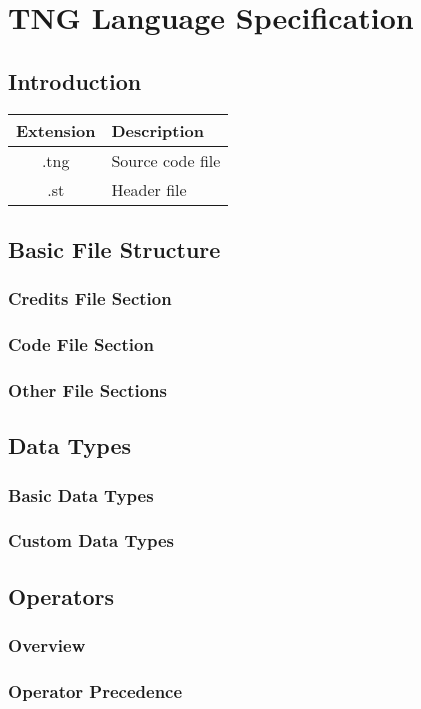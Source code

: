 \documentclass{book}
\begin{document}
\chapter{TNG Language Specification}
\section{Introduction}
\begin{tabular}{|c|l|}
  \hline
  \textbf{Extension} & \textbf{Description} \\
  \hline
  .tng & Source code file \\
  .st  & Header file \\
  \hline
\end{tabular}
\section{Basic File Structure}
\subsection{Credits File Section}
\subsection{Code File Section}
\subsection{Other File Sections}
\section{Data Types}
\subsection{Basic Data Types}
\subsection{Custom Data Types}
\section{Operators}
\subsection{Overview}
\subsection{Operator Precedence}
\end{document}
